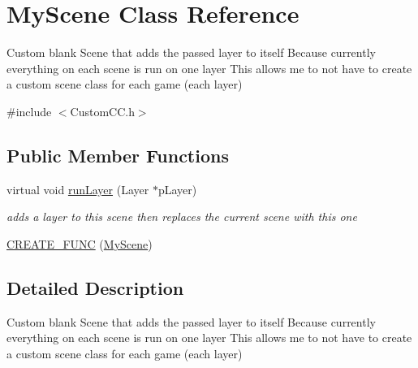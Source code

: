 \hypertarget{class_my_scene}{\section{\-My\-Scene \-Class \-Reference}
\label{class_my_scene}
}


\-Custom blank \-Scene that adds the passed layer to itself \-Because currently everything on each scene is run on one layer \-This allows me to not have to create a custom scene class for each game (each layer)  




{\ttfamily \#include $<$\-Custom\-C\-C.\-h$>$}

\subsection*{\-Public \-Member \-Functions}
\begin{DoxyCompactItemize}
\item 
virtual void \hyperlink{class_my_scene_a98a8eef56180480263e8c9298316f47c}{run\-Layer} (\-Layer $\ast$p\-Layer)
\begin{DoxyCompactList}\small\item\em adds a layer to this scene then replaces the current scene with this one \end{DoxyCompactList}\item 
\hyperlink{class_my_scene_ab001d48470a8829da03a21a2941fef36}{\-C\-R\-E\-A\-T\-E\-\_\-\-F\-U\-N\-C} (\hyperlink{class_my_scene}{\-My\-Scene})
\end{DoxyCompactItemize}


\subsection{\-Detailed \-Description}
\-Custom blank \-Scene that adds the passed layer to itself \-Because currently everything on each scene is run on one layer \-This allows me to not have to create a custom scene class for each game (each layer) 


